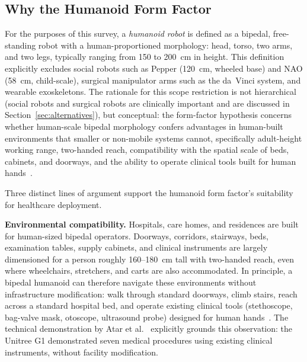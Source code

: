 \subsection{Why the Humanoid Form Factor}
\label{sec:formfactor}

For the purposes of this survey, a \emph{humanoid robot} is defined as a
bipedal, free-standing robot with a human-proportioned morphology: head, torso,
two arms, and two legs, typically ranging from 150 to 200~cm in height. This
definition explicitly excludes social robots such as Pepper (120~cm, wheeled
base) and NAO (58~cm, child-scale), surgical manipulator arms such as the
da~Vinci system, and wearable exoskeletons. The rationale for this scope
restriction is not hierarchical (social robots and surgical robots are
clinically important and are discussed in Section~\ref{sec:alternatives}), but
conceptual: the form-factor hypothesis concerns whether human-scale bipedal
morphology confers advantages in human-built environments that smaller or
non-mobile systems cannot, specifically adult-height working range, two-handed
reach, compatibility with the spatial scale of beds, cabinets, and doorways, and
the ability to operate clinical tools built for human
hands~\cite{adams2000humanoid,duffy2003anthropomorphism}.

Three distinct lines of argument support the humanoid form factor's suitability
for healthcare deployment.

\textbf{Environmental compatibility.} Hospitals, care homes, and residences are
built for human-sized bipedal operators. Doorways, corridors, stairways, beds,
examination tables, supply cabinets, and clinical instruments are largely
dimensioned for a person roughly 160--180~cm tall with two-handed reach, even
where wheelchairs, stretchers, and carts are also accommodated. In principle, a
bipedal humanoid can therefore navigate these environments without infrastructure
modification: walk through standard doorways, climb stairs, reach across a
standard hospital bed, and operate existing clinical tools (stethoscope,
bag-valve mask, otoscope, ultrasound probe) designed for human
hands~\cite{adams2000humanoid,krotkov2018darpa}.
The
technical demonstration by Atar et al.~\cite{atar2025humanoids} explicitly grounds
this observation: the Unitree G1 demonstrated seven medical procedures using
existing clinical instruments, without facility modification.

